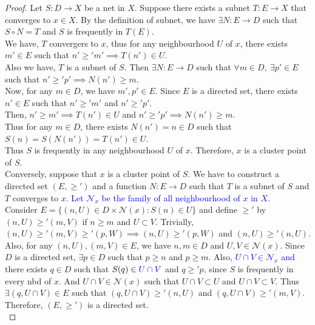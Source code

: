 \begin{proof}
	Let $S : D \to X$ be a net in $X$.
	Suppose there exists a subnet $T : E \to X$ that converges to $x \in X$.
	By the definition of subnet, we have $\exists N : E \to D$ such that $S \circ N = T$ and $S$ is frequently in $T(E)$.\\

	We have, $T$ convergers to $x$, thus for any neighbourhood $U$ of $x$, there exists $m' \in E$ such that $n' \ge' m' \implies T(n') \in U$.\\

	Also we have, $T$ is a subnet of $S$.
	Then $\exists N : E \to D$ such that
	$\forall m \in D,\ \exists p' \in E$ such that $n' \ge' p' \implies N(n') \ge m$.\\

	Now, for any $m \in D$, we have $m',p' \in E$.
	Since $E$ is a directed set, there exists $n' \in E$ such that $n' \ge' m'$ and $n' \ge' p'$.\\

	Then, $n' \ge m' \implies T(n') \in U$ and $n' \ge' p' \implies N(n') \ge m$.\\
	
	Thus for any $m \in D$, there exists $N(n') = n \in D$ such that $S(n) = S(N(n')) = T(n') \in U$.\\

	Thus $S$ is frequently in any neighbourhood $U$ of $x$. Therefore, $x$ is a cluster point of $S$.\\


	Conversely, suppose that $x$ is a cluster point of $S$.
	We have to construct a directed set $(E,\ge')$ and a function $N : E \to D$ such that $T$ is a subnet of $S$ and $T$ converges to $x$.
	\textcolor{blue}{Let $\mathcal{N}_x$ be the family of all neighbourhood of $x$ in $X$.}\\


	Consider $E = \{ (n,U) \in D \times \mathcal{N}(x) : S(n) \in U \}$ and define $\ge'$ by $(n,U) \ge' (m,V)$ if $n \ge m$ and $U \subset V$.
	Trivially, $(n,U) \ge' (m,V) \ge' (p,W) \implies (n,U) \ge' (p,W)$ and $(n,U) \ge' (n,U)$.
	Also, for any $(n,U),(m,V) \in E$, we have $n,m \in D$ and $U,V \in \mathcal{N}(x)$.
	Since $D$ is a directed set, $\exists p \in D$ such that $p \ge n$ and $p \ge m$.
	Also, \textcolor{blue}{$U \cap V \in \mathcal{N}_x$ and} there exists $q \in D$ such that $S(q) \in \textcolor{blue}{U \cap V}$ and $q \ge' p$, since $S$ is frequently in every nbd of $x$.
	And $U \cap V \in \mathcal{N}(x)$ such that $U \cap V \subset U$ and $U \cap V \subset V$.
	Thus $\exists (q,U\cap V) \in E$ such that $(q,U\cap V) \ge' (n,U)$ and $(q,U\cap V) \ge' (m,V)$.
	Therefore, $(E,\ge')$ is a directed set.\\



\end{proof}
